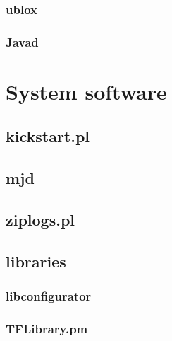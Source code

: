 \documentclass[11pt,a4paper,openany,oneside]{book}
\begin{document}
\subsection{ublox}

\subsection{Javad}


\chapter{System software}

\section{kickstart.pl}

\section{mjd}

\section{ziplogs.pl}



\section{libraries}

\subsection{libconfigurator}

\subsection{TFLibrary.pm}
\end{document}
